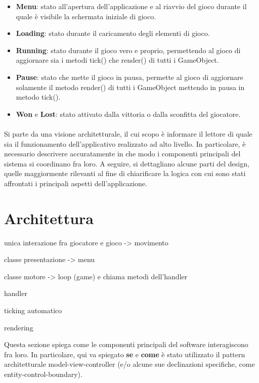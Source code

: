 \documentclass[a4paper,12pt]{report}
\begin{document}
\begin{itemize}
	\item \textbf{Menu}: stato all'apertura dell'applicazione e al riavvio del gioco durante il quale è visibile la schermata iniziale di gioco.
	\item \textbf{Loading}: stato durante il caricamento degli elementi di gioco.
	\item \textbf{Running}: stato durante il gioco vero e proprio, permettendo al gioco di aggiornare sia i metodi tick() che render() di tutti i GameObject.
	\item \textbf{Pause}: stato che mette il gioco in pausa, permette al gioco di aggiornare solamente il metodo render() di tutti i GameObject mettendo in pausa in metodo tick().
	\item \textbf{Won} e \textbf{Lost}: stato attivato dalla vittoria o dalla sconfitta del giocatore.
\end{itemize}

\paragraph{}
		
Si parte da una visione architetturale, il cui scopo è informare il lettore di quale sia il funzionamento dell'applicativo realizzato ad alto livello.
%
In particolare, è necessario descrivere accuratamente in che modo i componenti principali del sistema si coordinano fra loro.
%
A seguire, si dettagliano alcune parti del design, quelle maggiormente rilevanti al fine di chiarificare la logica con cui sono stati affrontati i principali aspetti dell'applicazione.

\section{Architettura}

unica interazione fra giocatore e gioco -> movimento

classe presentazione -> menu

classe motore -> loop (game) e chiama metodi dell'handler

handler

ticking automatico

rendering


Questa sezione spiega come le componenti principali del software interagiscono fra loro.
%
In particolare, qui va spiegato \textbf{se} e \textbf{come} è stato utilizzato il pattern
architetturale model-view-controller (e/o alcune sue declinazioni specifiche, come entity-control-boundary).
\end{document}
